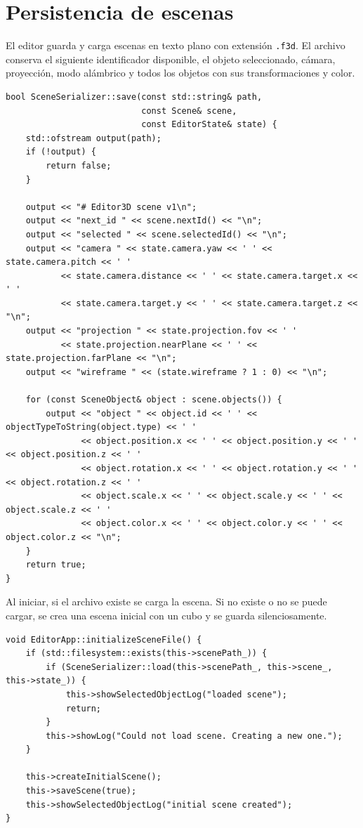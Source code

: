 \documentclass[a4paper,12pt]{article}
\begin{document}
\section{Persistencia de escenas}

El editor guarda y carga escenas en texto plano con extensión \texttt{.f3d}. El archivo conserva el siguiente identificador disponible, el objeto seleccionado, cámara, proyección, modo alámbrico y todos los objetos con sus transformaciones y color.


\begin{lstlisting}
bool SceneSerializer::save(const std::string& path,
                           const Scene& scene,
                           const EditorState& state) {
    std::ofstream output(path);
    if (!output) {
        return false;
    }

    output << "# Editor3D scene v1\n";
    output << "next_id " << scene.nextId() << "\n";
    output << "selected " << scene.selectedId() << "\n";
    output << "camera " << state.camera.yaw << ' ' << state.camera.pitch << ' '
           << state.camera.distance << ' ' << state.camera.target.x << ' '
           << state.camera.target.y << ' ' << state.camera.target.z << "\n";
    output << "projection " << state.projection.fov << ' '
           << state.projection.nearPlane << ' ' << state.projection.farPlane << "\n";
    output << "wireframe " << (state.wireframe ? 1 : 0) << "\n";

    for (const SceneObject& object : scene.objects()) {
        output << "object " << object.id << ' ' << objectTypeToString(object.type) << ' '
               << object.position.x << ' ' << object.position.y << ' ' << object.position.z << ' '
               << object.rotation.x << ' ' << object.rotation.y << ' ' << object.rotation.z << ' '
               << object.scale.x << ' ' << object.scale.y << ' ' << object.scale.z << ' '
               << object.color.x << ' ' << object.color.y << ' ' << object.color.z << "\n";
    }
    return true;
}
\end{lstlisting}

Al iniciar, si el archivo existe se carga la escena. Si no existe o no se puede cargar, se crea una escena inicial con un cubo y se guarda silenciosamente.

\begin{lstlisting}
void EditorApp::initializeSceneFile() {
    if (std::filesystem::exists(this->scenePath_)) {
        if (SceneSerializer::load(this->scenePath_, this->scene_, this->state_)) {
            this->showSelectedObjectLog("loaded scene");
            return;
        }
        this->showLog("Could not load scene. Creating a new one.");
    }

    this->createInitialScene();
    this->saveScene(true);
    this->showSelectedObjectLog("initial scene created");
}
\end{lstlisting}
\end{document}
